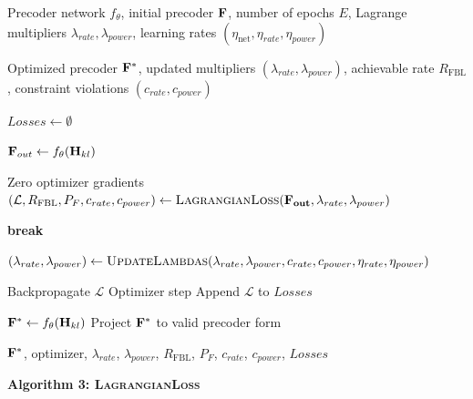 \documentclass[a4paper, 12pt, onecolumn, journal, twoside, draftclsnofoot]{IEEEtran}
\begin{document}
\begin{algorithmic}[1]

\Require
Precoder network $f_\theta$, initial precoder ${\bf F}$, number of epochs $E$, Lagrange multipliers $\lambda_{rate}, \lambda_{power}$,
learning rates $(\eta_{\text{net}}, \eta_{rate}, \eta_{power})$

\Ensure
Optimized precoder ${\bf F}^*$, updated multipliers
$(\lambda_{rate}, \lambda_{power})$, achievable rate $R_{\mathrm{FBL}}$,
constraint violations $(c_{rate}, c_{power})$

\State $Losses \gets \emptyset$


    \State ${\bf F}_{out} \gets f_\theta(\mathbf{H}_{kl})$

    \State Zero optimizer gradients
    \State
    $(\mathcal{L},
    R_{\mathrm{FBL}},
    P_F,
    c_{rate},
    c_{power})
    \gets
    \textsc{LagrangianLoss}(\mathbf{F_{out}}, \lambda_{rate}, \lambda_{power})$

        \State \textbf{break}
    \EndIf

    \State
    $(\lambda_{rate}, \lambda_{power})
    \gets
    \textsc{UpdateLambdas}(\lambda_{rate}, \lambda_{power},
    c_{rate}, c_{power},
    \eta_{rate}, \eta_{power})$

    \State Backpropagate $\mathcal{L}$
    \State Optimizer step
    \State Append $\mathcal{L}$ to $Losses$

\EndFor

\State ${\bf F}^* \gets f_\theta(\mathbf{H}_{kl})$
\State Project ${\bf F}^*$ to valid precoder form 

\State \Return
${\bf F}^*$, optimizer,
$\lambda_{rate}$, $\lambda_{power}$,
$R_{\mathrm{FBL}}$, $P_F$,
$c_{rate}$, $c_{power}$, $Losses$

\end{algorithmic}

\newpage
\noindent\textbf{Algorithm 3: \textsc{LagrangianLoss}}
\end{document}
